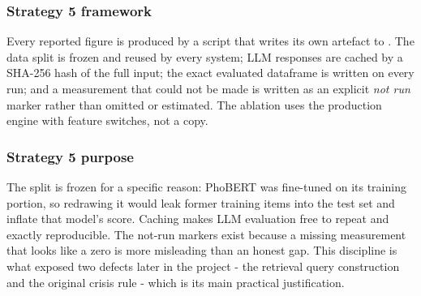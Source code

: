 \subsubsection{Strategy 5 framework}
Every reported figure is produced by a script that writes its own artefact to . The data split is frozen and reused by every system; LLM responses are cached by a SHA-256 hash of the full input; the exact evaluated dataframe is written on every run; and a measurement that could not be made is written as an explicit \textit{not run} marker rather than omitted or estimated. The ablation uses the production engine with feature switches, not a copy.

\subsubsection{Strategy 5 purpose}
The split is frozen for a specific reason: PhoBERT was fine-tuned on its training portion, so redrawing it would leak former training items into the test set and inflate that model's score. Caching makes LLM evaluation free to repeat and exactly reproducible. The not-run markers exist because a missing measurement that looks like a zero is more misleading than an honest gap. This discipline is what exposed two defects later in the project - the retrieval query construction and the original crisis rule - which is its main practical justification.

